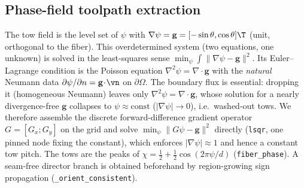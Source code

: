 \documentclass[11pt]{article}
\begin{document}
\subsection{Phase-field toolpath extraction}
The tow field is the level set of $\psi$ with $\nabla\psi=\mathbf g=[-\sin\theta,
\cos\theta]\T$ (unit, orthogonal to the fiber). This overdetermined system
(two equations, one unknown) is solved in the least-squares sense
$\min_\psi\int\lVert\nabla\psi-\mathbf g\rVert^2$. Its Euler--Lagrange condition is
the Poisson equation $\nabla^2\psi=\nabla\!\cdot\mathbf g$ with the \emph{natural}
Neumann data $\partial\psi/\partial n=\mathbf g\!\cdot\!\vn$ on $\partial\Omega$.
The boundary flux is essential: dropping it (homogeneous Neumann) leaves only
$\nabla^2\psi=\nabla\!\cdot\mathbf g$, whose solution for a nearly divergence-free
$\mathbf g$ collapses to $\psi\approx\mathrm{const}$ ($|\nabla\psi|\!\to\!0$), i.e.\
washed-out tows. We therefore assemble the discrete forward-difference gradient
operator $G=[G_x;G_y]$ on the grid and solve $\min_\psi\lVert G\psi-\mathbf
g\rVert^2$ directly (\texttt{lsqr}, one pinned node fixing the constant), which
enforces $|\nabla\psi|\approx1$ and hence a constant tow pitch. The tows are the
peaks of $\chi=\tfrac12+\tfrac12\cos(2\pi\psi/d)$ (\texttt{fiber\_phase}). A
seam-free director branch is obtained beforehand by region-growing sign
propagation (\texttt{\_orient\_consistent}).
\end{document}
